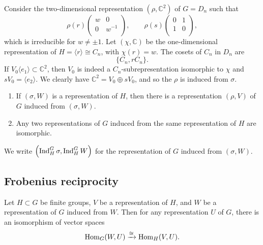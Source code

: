 \begin{example}
    Consider the two-dimensional representation $(\rho, \mathbb C^2)$ of $G = D_n$ such that
    \[
        \rho(r)
        \begin{pmatrix}
            w & 0 \\ 0 & w^{-1} \\
        \end{pmatrix}, \qquad
        \rho(s)
        \begin{pmatrix}
            0 & 1 \\ 1 & 0 \\
        \end{pmatrix},
    \]
    which is irreducible for $w \neq \pm 1$. Let $(\chi, \mathbb C)$ be the one-dimensional representation of $H = \langle r \rangle \cong C_n$, with $\chi(r) = w$. The cosets of $C_n$ in $D_n$ are
    \[ \{C_n, rC_n\}. \]
    If $V_0 \langle e_1 \rangle \subset \mathbb C^2$, then $V_0$ is indeed a $C_n$-subrepresentation isomorphic to $\chi$ and $sV_0 = \langle e_2 \rangle$. We clearly have $\mathbb C^2 = V_0 \oplus sV_0$, and so the $\rho$ is induced from $\sigma$.
\end{example}

\begin{proposition}
    \hspace{0em}
    \begin{enumerate}
        \item If $(\sigma, W)$ is a representation of $H$, then there is a representation $(\rho, V)$ of $G$ induced from $(\sigma, W)$.
        \item Any two representations of $G$ induced from the same representation of $H$ are isomorphic.
    \end{enumerate}
\end{proposition}

We write $\left(\operatorname{Ind}_H^G\sigma, \operatorname{Ind}_H^GW\right)$ for the representation of $G$ induced from $(\sigma, W)$.

\subsection{Frobenius reciprocity}

\begin{theorem}
    Let $H \subset G$ be finite groups, $V$ be a representation of $H$, and $W$ be a representation of $G$ induced from $W$. Then for any representation $U$ of $G$, there is an isomorphism of vector spaces
    \[ \operatorname{Hom}_G(W, U) \xrightarrow{\cong} \operatorname{Hom}_H(V, U). \]
\end{theorem}

